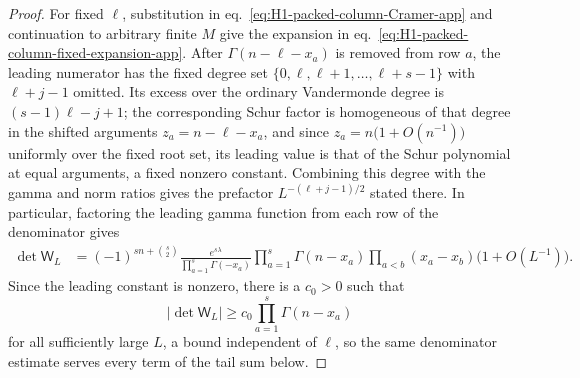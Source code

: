 \documentclass[a4paper,11pt]{article}
\def\ee{e}%
\theoremstyle{definition}
\theoremstyle{remark}
\newcommand{\ee}{\mathrm e}
\begin{document}
\begin{proof}
For fixed \(\ell\), substitution in
eq.~\eqref{eq:H1-packed-column-Cramer-app} and continuation to
arbitrary finite \(M\) give the expansion in
eq.~\eqref{eq:H1-packed-column-fixed-expansion-app}. After
\(\Gamma(n-\ell-x_a)\) is removed from row \(a\), the leading numerator
has the fixed degree set
\(\{0,\ell,\ell+1,\ldots,\ell+s-1\}\) with
\(\ell+j-1\) omitted. Its excess over the ordinary Vandermonde degree
is \((s-1)\ell-j+1\); the corresponding Schur factor is homogeneous of that degree in the
shifted arguments $z_a=n-\ell-x_a$, and since $z_a=n\bigl(1+O(n^{-1})\bigr)$ uniformly over the
fixed root set, its leading value is that of the Schur polynomial at equal arguments, a fixed
nonzero constant.  Combining this degree with the gamma and norm ratios
gives the prefactor \(L^{-(\ell+j-1)/2}\) stated there. In particular,
factoring the leading gamma function from each row of the denominator
gives 
\begin{equation}
\begin{aligned}
   \det\mathsf W_L
   &={}
   (-1)^{sn+\binom{s}{2}}
   \frac{\ee^{s\lambda}}
   {\prod_{a=1}^{s}\Gamma(-x_a)}
   \prod_{a=1}^{s}\Gamma(n-x_a)
   \prod_{a<b}(x_a-x_b)
   \bigl(1+O(L^{-1})\bigr).
\end{aligned}
   \label{eq:H1-packed-denominator-app}
\end{equation}
Since the leading constant is nonzero, there is a \(c_0>0\) such that
\begin{equation}
   |\det\mathsf W_L|
   \ge
   c_0\prod_{a=1}^{s}\Gamma(n-x_a)
   \label{eq:H1-packed-denominator-lower-app}
\end{equation}
for all sufficiently large \(L\), a bound
independent of \(\ell\), so the same denominator estimate serves every term of the tail sum
below.


\end{proof}
\end{document}
